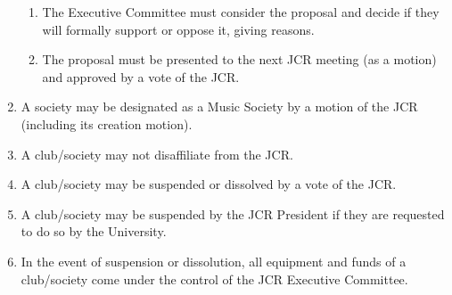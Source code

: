 \documentclass[12pt]{article}
\begin{document}
\begin{enumerate}
\begin{enumerate}
        \item The Executive Committee must consider the proposal and decide if they will formally support or oppose it, giving reasons.
        \item The proposal must be presented to the next JCR meeting (as a motion) and approved by a vote of the JCR.
    \end{enumerate}
    \item A society may be designated as a Music Society by a motion of the JCR (including its creation motion).
    \item A club/society may not disaffiliate from the JCR.
    \item A club/society may be suspended or dissolved by a vote of the JCR.
    \item A club/society may be suspended by the JCR President if they are requested to do so by the University.
    \item In the event of suspension or dissolution, all equipment and funds of a club/society come under the control of the JCR Executive Committee.
\end{enumerate}
\newpage
\end{document}
